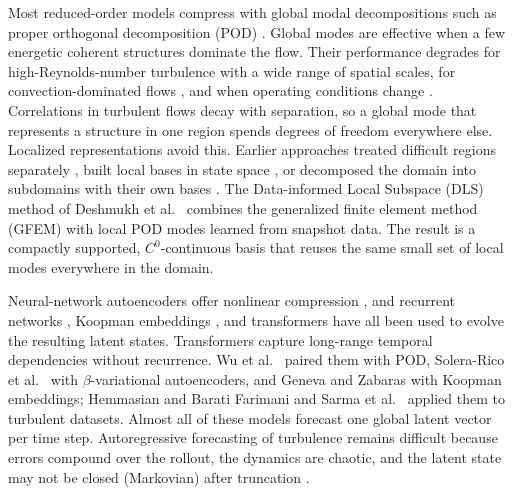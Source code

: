 \documentclass[conf]{new-aiaa}
\begin{document}
Most reduced-order models compress with global modal decompositions such as proper orthogonal decomposition (POD) \cite{sirovich1987,berkooz1993,holmes2012turbulence,taira2017modal,taira2020modal}. Global modes are effective when a few energetic coherent structures dominate the flow. Their performance degrades for high-Reynolds-number turbulence with a wide range of spatial scales, for convection-dominated flows \cite{mojgani2017lagrangian}, and when operating conditions change \cite{deshmukh2016sparse}. Correlations in turbulent flows decay with separation, so a global mode that represents a structure in one region spends degrees of freedom everywhere else. Localized representations avoid this. Earlier approaches treated difficult regions separately \cite{lucia2001thesis}, built local bases in state space \cite{amsallem2012local}, or decomposed the domain into subdomains with their own bases \cite{hoang2021ddlspg,diaz2024ddnm}. The Data-informed Local Subspace (DLS) method of Deshmukh et al.~\cite{deshmukh2020dls} combines the generalized finite element method (GFEM) \cite{melenk1996pum,babuska2004gfem} with local POD modes learned from snapshot data. The result is a compactly supported, $C^0$-continuous basis that reuses the same small set of local modes everywhere in the domain.

Neural-network autoencoders offer nonlinear compression \cite{gonzalez2018deep,lee2020cae,eivazi2022betavae}, and recurrent networks \cite{srinivasan2019,eivazi2021koopman,borrelli2022channels,vlachas2020backprop}, Koopman embeddings \cite{lusch2018koopman}, and transformers \cite{vaswani2017attention} have all been used to evolve the resulting latent states. Transformers capture long-range temporal dependencies without recurrence. Wu et al.~\cite{wu2022transformer} paired them with POD, Solera-Rico et al.~\cite{solera2024betavae} with $\beta$-variational autoencoders, and Geneva and Zabaras \cite{geneva2022transformers} with Koopman embeddings; Hemmasian and Barati Farimani \cite{hemmasian2023transformers} and Sarma et al.~\cite{sarma2024tbl} applied them to turbulent datasets. Almost all of these models forecast one global latent vector per time step. Autoregressive forecasting of turbulence remains difficult because errors compound over the rollout, the dynamics are chaotic, and the latent state may not be closed (Markovian) after truncation \cite{lusch2018koopman,linot2023stabilized,kohl2023acdm,lippe2023pderefiner}.
\end{document}
